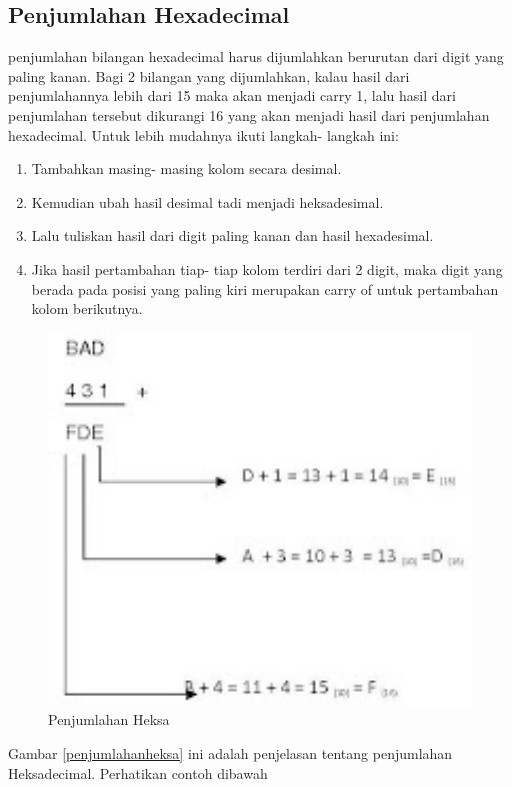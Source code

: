 	\subsection {Penjumlahan Hexadecimal}
	penjumlahan bilangan hexadecimal harus dijumlahkan berurutan dari digit yang paling kanan. Bagi 2 bilangan yang dijumlahkan, kalau hasil dari penjumlahannya lebih dari 15 maka akan menjadi carry 1, lalu hasil dari penjumlahan tersebut dikurangi 16 yang akan menjadi hasil dari penjumlahan hexadecimal.
	Untuk lebih mudahnya ikuti langkah- langkah ini:
		\begin{enumerate}
			\item Tambahkan masing- masing kolom secara desimal.
			\item Kemudian ubah hasil desimal tadi menjadi heksadesimal.
			\item Lalu tuliskan hasil dari digit paling kanan dan hasil hexadesimal.
			\item Jika hasil pertambahan tiap- tiap kolom terdiri dari 2 digit, maka digit yang berada pada posisi yang paling kiri merupakan carry of untuk pertambahan kolom berikutnya.
		\end{enumerate}
			\begin{figure} [ht]
				\centerline{\includegraphics[width=1\textwidth]{figures/penjumlahanheksa.jpg}}
				\caption{Penjumlahan Heksa}
				\label{Penjumlahan-Heksa}
			\end{figure}
	Gambar \ref{penjumlahanheksa} ini adalah penjelasan tentang penjumlahan Heksadecimal.		
	Perhatikan contoh dibawah

